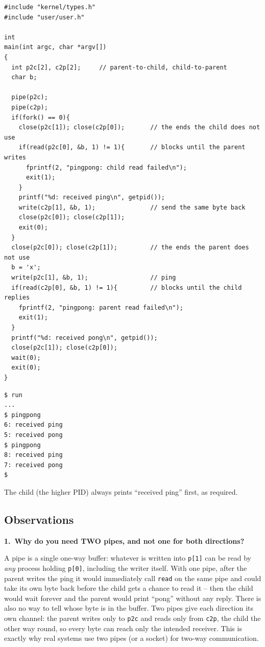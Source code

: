 \documentclass[12pt,a4paper]{article}
\newcommand{\qa}[2]{%
  \par\needspace{5\baselineskip}\medskip
  \noindent\textbf{#1.~#2}\par\smallskip\noindent}
\begin{document}
\begin{lstlisting}[style=code,caption={user/pingpong.c}]
#include "kernel/types.h"
#include "user/user.h"

int
main(int argc, char *argv[])
{
  int p2c[2], c2p[2];     // parent-to-child, child-to-parent
  char b;

  pipe(p2c);
  pipe(c2p);
  if(fork() == 0){
    close(p2c[1]); close(c2p[0]);       // the ends the child does not use
    if(read(p2c[0], &b, 1) != 1){       // blocks until the parent writes
      fprintf(2, "pingpong: child read failed\n");
      exit(1);
    }
    printf("%d: received ping\n", getpid());
    write(c2p[1], &b, 1);               // send the same byte back
    close(p2c[0]); close(c2p[1]);
    exit(0);
  }
  close(p2c[0]); close(c2p[1]);         // the ends the parent does not use
  b = 'x';
  write(p2c[1], &b, 1);                 // ping
  if(read(c2p[0], &b, 1) != 1){         // blocks until the child replies
    fprintf(2, "pingpong: parent read failed\n");
    exit(1);
  }
  printf("%d: received pong\n", getpid());
  close(p2c[1]); close(c2p[0]);
  wait(0);
  exit(0);
}
\end{lstlisting}

\begin{lstlisting}[style=terminal,caption={Running pingpong (after one run of run, so the PIDs are 5 and 6)}]
$ run
...
$ pingpong
6: received ping
5: received pong
$ pingpong
8: received ping
7: received pong
$
\end{lstlisting}

The child (the higher PID) always prints ``received ping'' first, as required.

\subsection*{Observations}

\qa{1}{Why do you need TWO pipes, and not one for both directions?}
A pipe is a single one-way buffer: whatever is written into \texttt{p[1]} can be read by \textit{any} process holding \texttt{p[0]}, including the writer itself. With one pipe, after the parent writes the ping it would immediately call \texttt{read} on the same pipe and could take its own byte back before the child gets a chance to read it -- then the child would wait forever and the parent would print ``pong'' without any reply. There is also no way to tell whose byte is in the buffer. Two pipes give each direction its own channel: the parent writes only to \texttt{p2c} and reads only from \texttt{c2p}, the child the other way round, so every byte can reach only the intended receiver. This is exactly why real systems use two pipes (or a socket) for two-way communication.
\end{document}
